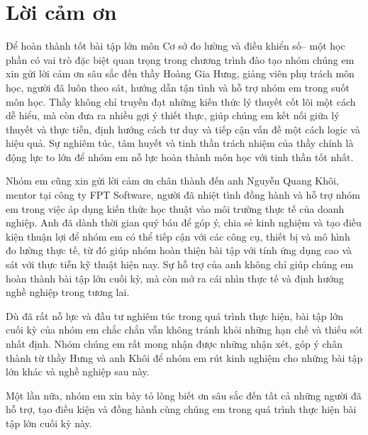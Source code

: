 \chapter*{Lời cảm ơn}

Để hoàn thành tốt bài tập lớn môn Cơ sở đo lường và điều khiển số– một học phần có vai trò đặc biệt quan trọng trong chương trình đào tạo nhóm chúng em xin gửi lời cảm ơn sâu sắc đến thầy Hoàng Gia Hưng, giảng viên phụ trách môn học, người đã luôn theo sát, hướng dẫn tận tình và hỗ trợ nhóm em trong suốt môn học. Thầy không chỉ truyền đạt những kiến thức lý thuyết cốt lõi một cách dễ hiểu, mà còn đưa ra nhiều gợi ý thiết thực, giúp chúng em kết nối giữa lý thuyết và thực tiễn, định hướng cách tư duy và tiếp cận vấn đề một cách logic và hiệu quả. Sự nghiêm túc, tâm huyết và tinh thần trách nhiệm của thầy chính là động lực to lớn để nhóm em nỗ lực hoàn thành môn học với tinh thần tốt nhất.

Nhóm em cũng xin gửi lời cảm ơn chân thành đến anh Nguyễn Quang Khôi, mentor tại công ty FPT Software, người đã nhiệt tình đồng hành và hỗ trợ nhóm em trong việc áp dụng kiến thức học thuật vào môi trường thực tế của doanh nghiệp. Anh đã dành thời gian quý báu để góp ý, chia sẻ kinh nghiệm và tạo điều kiện thuận lợi để nhóm em có thể tiếp
cận với các công cụ, thiết bị và mô hình đo lường thực tế, từ đó giúp nhóm hoàn thiện bài tập với tính ứng dụng cao và sát với thực tiễn kỹ thuật hiện nay. Sự hỗ trợ của anh không chỉ giúp chúng em hoàn thành bài tập lớn cuối kỳ, mà còn mở ra cái nhìn thực tế và định hướng nghề nghiệp trong tương lai.

Dù đã rất nỗ lực và đầu tư nghiêm túc trong quá trình thực hiện, bài tập lớn cuối kỳ của nhóm em chắc chắn vẫn không tránh khỏi những hạn chế và thiếu sót nhất định. Nhóm chúng em rất mong nhận được những nhận xét, góp ý chân thành từ thầy Hưng và anh Khôi để nhóm em rút kinh nghiệm cho những bài tập lớn khác và nghề nghiệp
sau này.

Một lần nữa, nhóm em xin bày tỏ lòng biết ơn sâu sắc đến tất cả những người đã hỗ trợ, tạo điều kiện và đồng hành cùng chúng em trong quá trình thực hiện bài tập lớn cuối kỳ này.